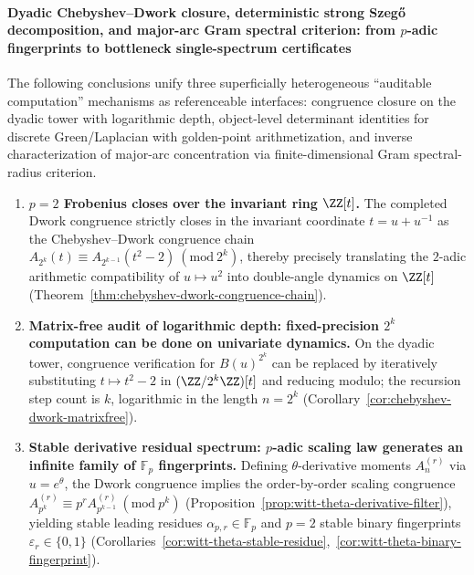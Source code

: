 \paragraph{Dyadic Chebyshev--Dwork closure, deterministic strong Szeg\H{o} decomposition, and major-arc Gram spectral criterion: from \texorpdfstring{$p$}{p}-adic fingerprints to bottleneck single-spectrum certificates}
The following conclusions unify three superficially heterogeneous ``auditable computation'' mechanisms as referenceable interfaces: congruence closure on the dyadic tower with logarithmic depth, object-level determinant identities for discrete Green/Laplacian with golden-point arithmetization, and inverse characterization of major-arc concentration via finite-dimensional Gram spectral-radius criterion.
\begin{enumerate}
  \item \textbf{\texorpdfstring{$p=2$}{p=2} Frobenius closes over the invariant ring \texorpdfstring{$\ZZ[t]$}{Z[t]}.}
  The completed Dwork congruence strictly closes in the invariant coordinate \(t=u+u^{-1}\) as the Chebyshev--Dwork congruence chain
  \(
  A_{2^k}(t)\equiv A_{2^{k-1}}(t^2-2)\ (\mathrm{mod}\ 2^k)
  \), thereby precisely translating the \(2\)-adic arithmetic compatibility of \(u\mapsto u^2\) into double-angle dynamics on \(\ZZ[t]\) (Theorem~\ref{thm:chebyshev-dwork-congruence-chain}).

  \item \textbf{Matrix-free audit of logarithmic depth: fixed-precision \texorpdfstring{$2^k$}{2^k} computation can be done on univariate dynamics.}
  On the dyadic tower, congruence verification for \(B(u)^{2^k}\) can be replaced by iteratively substituting \(t\mapsto t^2-2\) in \((\ZZ/2^k\ZZ)[t]\) and reducing modulo; the recursion step count is \(k\), logarithmic in the length \(n=2^k\) (Corollary~\ref{cor:chebyshev-dwork-matrixfree}).

  \item \textbf{Stable derivative residual spectrum: \texorpdfstring{$p$}{p}-adic scaling law generates an infinite family of \texorpdfstring{$\mathbb{F}_p$}{F_p} fingerprints.}
  Defining \(\theta\)-derivative moments \(A^{(r)}_n\) via \(u=e^\theta\), the Dwork congruence implies the order-by-order scaling congruence
  \(A^{(r)}_{p^k}\equiv p^rA^{(r)}_{p^{k-1}}\ (\mathrm{mod}\ p^k)\)
  (Proposition~\ref{prop:witt-theta-derivative-filter}), yielding stable leading residues
  \(\alpha_{p,r}\in\mathbb{F}_p\) and \(p=2\) stable binary fingerprints \(\varepsilon_r\in\{0,1\}\) (Corollaries~\ref{cor:witt-theta-stable-residue},~\ref{cor:witt-theta-binary-fingerprint}).


\end{enumerate}
